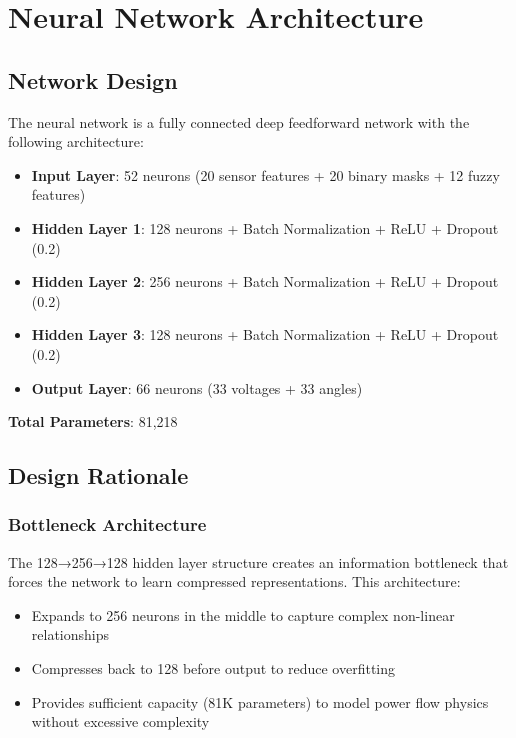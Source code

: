 \documentclass[12pt,a4paper]{report}
\begin{document}
\section{Neural Network Architecture}

\subsection{Network Design}

The neural network is a fully connected deep feedforward network with the following architecture:

\begin{itemize}
    \item \textbf{Input Layer}: 52 neurons (20 sensor features + 20 binary masks + 12 fuzzy features)
    \item \textbf{Hidden Layer 1}: 128 neurons + Batch Normalization + ReLU + Dropout (0.2)
    \item \textbf{Hidden Layer 2}: 256 neurons + Batch Normalization + ReLU + Dropout (0.2)
    \item \textbf{Hidden Layer 3}: 128 neurons + Batch Normalization + ReLU + Dropout (0.2)
    \item \textbf{Output Layer}: 66 neurons (33 voltages + 33 angles)
\end{itemize}

\textbf{Total Parameters}: 81,218

\subsection{Design Rationale}

\subsubsection{Bottleneck Architecture}

The 128→256→128 hidden layer structure creates an information bottleneck that forces the network to learn compressed representations. This architecture:
\begin{itemize}
    \item Expands to 256 neurons in the middle to capture complex non-linear relationships
    \item Compresses back to 128 before output to reduce overfitting
    \item Provides sufficient capacity (81K parameters) to model power flow physics without excessive complexity
\end{itemize}
\end{document}
